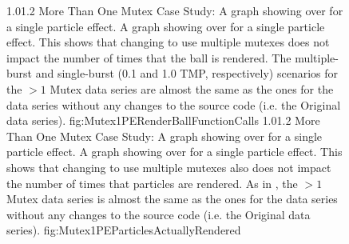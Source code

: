 \begin{figure}
\addtocounter{figure}{-1}

	\vspace{-1.5cm}
	{1.0}{1.2}
	{More Than One Mutex Case Study: A graph showing  over  for a single particle effect.}
	{A graph showing  over  for a single particle effect. This shows that changing  to use multiple mutexes does not impact the number of times that the ball is rendered. The multiple-burst and single-burst (0.1 and 1.0 TMP, respectively) scenarios for the $ > 1 $ Mutex data series are almost the same as the ones for the data series without any changes to the source code (i.e. the Original data series). }
	{fig:Mutex1PERenderBallFunctionCalls}
	\vspace{-1.5cm}
	{1.0}{1.2}
	{More Than One Mutex Case Study: A graph showing  over  for a single particle effect.}
	{A graph showing  over  for a single particle effect. This shows that changing  to use multiple mutexes also does not impact the number of times that particles are rendered. As in , the $ > 1 $ Mutex data series is almost the same as the ones for the data series without any changes to the source code (i.e. the Original data series).}
	{fig:Mutex1PEParticlesActuallyRendered}

\end{figure}

